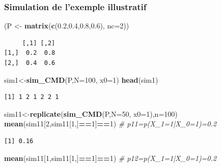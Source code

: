 \documentclass[
]{book}
\newenvironment{Shaded}{\begin{snugshade}}{\end{snugshade}}
\newcommand{\CommentTok}[1]{\textcolor[rgb]{0.56,0.35,0.01}{\textit{#1}}}
\newcommand{\DataTypeTok}[1]{\textcolor[rgb]{0.13,0.29,0.53}{#1}}
\newcommand{\DecValTok}[1]{\textcolor[rgb]{0.00,0.00,0.81}{#1}}
\newcommand{\FloatTok}[1]{\textcolor[rgb]{0.00,0.00,0.81}{#1}}
\newcommand{\KeywordTok}[1]{\textcolor[rgb]{0.13,0.29,0.53}{\textbf{#1}}}
\newcommand{\NormalTok}[1]{#1}
\newcommand{\OperatorTok}[1]{\textcolor[rgb]{0.81,0.36,0.00}{\textbf{#1}}}
\newcommand{\StringTok}[1]{\textcolor[rgb]{0.31,0.60,0.02}{#1}}
\theoremstyle{definition}
\theoremstyle{definition}
\theoremstyle{definition}
\theoremstyle{remark}
\begin{document}
\hypertarget{simulation-de-lexemple-illustratif}{%
\subsubsection{Simulation de l'exemple illustratif}\label{simulation-de-lexemple-illustratif}}

\begin{Shaded}
\begin{Highlighting}[]
\NormalTok{(P <-}\StringTok{ }\KeywordTok{matrix}\NormalTok{(}\KeywordTok{c}\NormalTok{(}\FloatTok{0.2}\NormalTok{,}\FloatTok{0.4}\NormalTok{,}\FloatTok{0.8}\NormalTok{,}\FloatTok{0.6}\NormalTok{), }\DataTypeTok{nc=}\DecValTok{2}\NormalTok{))}
\end{Highlighting}
\end{Shaded}

\begin{verbatim}
     [,1] [,2]
[1,]  0.2  0.8
[2,]  0.4  0.6
\end{verbatim}

\begin{Shaded}
\begin{Highlighting}[]
\NormalTok{sim1<-}\KeywordTok{sim_CMD}\NormalTok{(P,}\DataTypeTok{N=}\DecValTok{100}\NormalTok{, }\DataTypeTok{x0=}\DecValTok{1}\NormalTok{)}
\KeywordTok{head}\NormalTok{(sim1)}
\end{Highlighting}
\end{Shaded}

\begin{verbatim}
[1] 1 2 1 2 2 1
\end{verbatim}

\begin{Shaded}
\begin{Highlighting}[]
\NormalTok{sim11<-}\KeywordTok{replicate}\NormalTok{(}\KeywordTok{sim_CMD}\NormalTok{(P,}\DataTypeTok{N=}\DecValTok{50}\NormalTok{, }\DataTypeTok{x0=}\DecValTok{1}\NormalTok{),}\DataTypeTok{n=}\DecValTok{100}\NormalTok{)}
\KeywordTok{mean}\NormalTok{(sim11[}\DecValTok{2}\NormalTok{,sim11[}\DecValTok{1}\NormalTok{,]}\OperatorTok{==}\DecValTok{1}\NormalTok{]}\OperatorTok{==}\DecValTok{1}\NormalTok{) }\CommentTok{# p11=p(X_1=1|X_0=1)=0.2}
\end{Highlighting}
\end{Shaded}

\begin{verbatim}
[1] 0.16
\end{verbatim}

\begin{Shaded}
\begin{Highlighting}[]
\KeywordTok{mean}\NormalTok{(sim11[}\DecValTok{1}\NormalTok{,sim11[}\DecValTok{1}\NormalTok{,]}\OperatorTok{==}\DecValTok{1}\NormalTok{]}\OperatorTok{==}\DecValTok{1}\NormalTok{) }\CommentTok{# p12=p(X_1=1|X_0=1)=0.2}
\end{Highlighting}
\end{Shaded}
\end{document}
